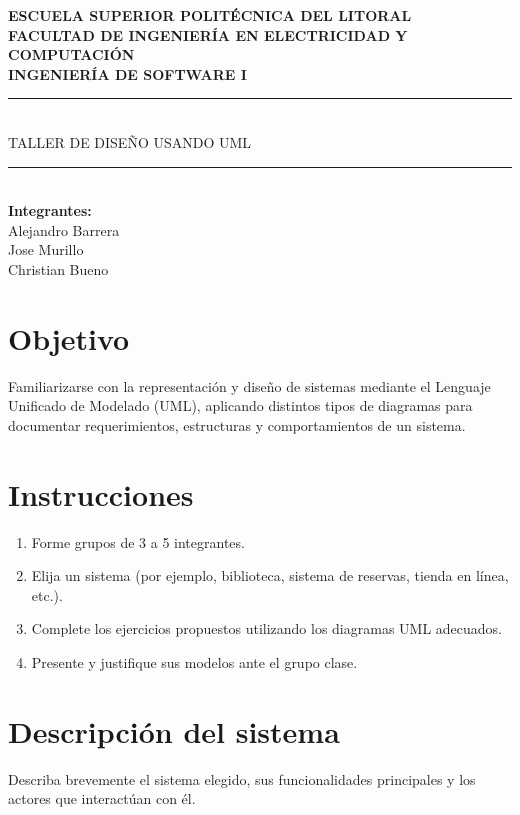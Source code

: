 \documentclass[12pt,a4paper]{article}
\begin{document}
\begin{center}
    \textbf{\Large ESCUELA SUPERIOR POLITÉCNICA DEL LITORAL}\\[0.2cm]
    \textbf{\large FACULTAD DE INGENIERÍA EN ELECTRICIDAD Y COMPUTACIÓN}\\[0.2cm]
    \textbf{\large INGENIERÍA DE SOFTWARE I}\\[0.5cm]
    \rule{16cm}{0.5pt}\\[0.5cm]
    {\Huge TALLER DE DISEÑO USANDO UML}\\[0.5cm]
    \rule{16cm}{0.5pt}\\[0.5cm]
    \textbf{Integrantes:}\\
    Alejandro Barrera\\
    Jose Murillo\\
    Christian Bueno\\[1cm]
\end{center}

\section*{Objetivo}
Familiarizarse con la representación y diseño de sistemas mediante el Lenguaje Unificado de Modelado (UML), aplicando distintos tipos de diagramas para documentar requerimientos, estructuras y comportamientos de un sistema.

\section*{Instrucciones}
\begin{enumerate}
    \item Forme grupos de 3 a 5 integrantes.
    \item Elija un sistema (por ejemplo, biblioteca, sistema de reservas, tienda en línea, etc.).
    \item Complete los ejercicios propuestos utilizando los diagramas UML adecuados.
    \item Presente y justifique sus modelos ante el grupo clase.
\end{enumerate}

\section{Descripción del sistema}
Describa brevemente el sistema elegido, sus funcionalidades principales y los actores que interactúan con él.

\vspace{2cm}
\end{document}
